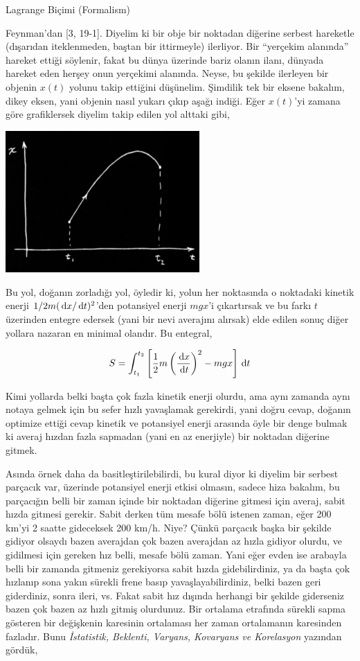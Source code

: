 \documentclass[12pt,fleqn]{article}\usepackage{../../common}
\begin{document}
Lagrange Biçimi (Formalism)

Feynman'dan [3, 19-1].  Diyelim ki bir obje bir noktadan diğerine serbest
hareketle (dışarıdan iteklenmeden, baştan bir ittirmeyle) ilerliyor. Bir
``yerçekim alanında'' hareket ettiği söylenir, fakat bu dünya üzerinde
bariz olanın ilanı, dünyada hareket eden herşey onun yerçekimi
alanında. Neyse, bu şekilde ilerleyen bir objenin $x(t)$ yolunu takip
ettiğini düşünelim. Şimdilik tek bir eksene bakalım, dikey eksen, yani
objenin nasıl yukarı çıkıp aşağı indiği. Eğer $x(t)$'yi zamana göre
grafiklersek diyelim takip edilen yol alttaki gibi,

\includegraphics[width=20em]{phy_lagrange_04.png}

Bu yol, doğanın zorladığı yol, öyledir ki, yolun her noktasında o noktadaki
kinetik enerji $1/2 m(\,\mathrm{d} x/\,\mathrm{d} t)^2$'den potansiyel enerji $mgx$'i
çıkartırsak ve bu farkı $t$ üzerinden entegre edersek (yani bir nevi
averajını alırsak) elde edilen sonuç diğer yollara nazaran en minimal
olandır. Bu entegral,

$$ 
S = \int _{t_1}^{t_2} 
\left[ 
\frac{1}{2} m \left( \frac{\,\mathrm{d} x}{\,\mathrm{d} t} \right)^2 - mgx 
\right] \,\mathrm{d} t
$$

Kimi yollarda belki başta çok fazla kinetik enerji olurdu, ama aynı zamanda
aynı notaya gelmek için bu sefer hızlı yavaşlamak gerekirdi, yani doğru
cevap, doğanın optimize ettiği cevap kinetik ve potansiyel enerji arasında
öyle bir denge bulmak ki averaj hızdan fazla sapmadan (yani en az
enerjiyle) bir noktadan diğerine gitmek. 

Asında örnek daha da basitleştirilebilirdi, bu kural diyor ki diyelim bir
serbest parçacık var, üzerinde potansiyel enerji etkisi olmasın, sadece
hiza bakalım, bu parçacığın belli bir zaman içinde bir noktadan diğerine
gitmesi için averaj, sabit hızda gitmesi gerekir. Sabit derken tüm mesafe
bölü istenen zaman, eğer 200 km'yi 2 saatte gideceksek 200 km/h. Niye?
Çünkü parçacık başka bir şekilde gidiyor olsaydı bazen averajdan çok bazen
averajdan az hızla gidiyor olurdu, ve gidilmesi için gereken hız belli,
mesafe bölü zaman. Yani eğer evden ise arabayla belli bir zamanda gitmeniz
gerekiyorsa sabit hızda gidebilirdiniz, ya da başta çok hızlanıp sona yakın
sürekli frene basıp yavaşlayabilirdiniz, belki bazen geri giderdiniz, sonra
ileri, vs. Fakat sabit hız dışında herhangi bir şekilde giderseniz bazen
çok bazen az hızlı gitmiş olurdunuz. Bir ortalama etrafında sürekli sapma
gösteren bir değişkenin karesinin ortalaması her zaman ortalamanın
karesinden fazladır. Bunu {\em İstatistik, Beklenti, Varyans, Kovaryans ve
  Korelasyon} yazından gördük,
\end{document}
